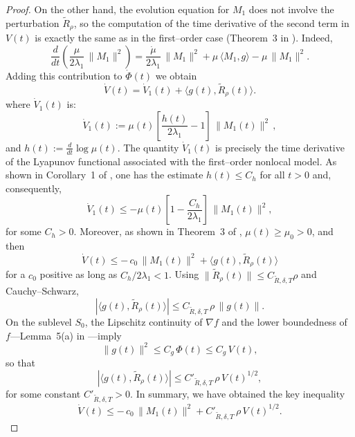 \documentclass{article} %
\begin{document}
\begin{proof}
On the other hand, the evolution equation for $M_1$ does not involve the perturbation $\widetilde R_\rho$, so the computation of the time derivative of the second term in $V(t)$ is exactly the same as in the first–order case (Theorem~3 in \cite{heredia2025modelingadagradrmspropadam}). Indeed,
\[
\frac{d}{dt}\!\left(\frac{\mu}{2\lambda_1}\,\|M_1\|^2\right)
=
\frac{\dot\mu}{2\lambda_1}\,\|M_1\|^2
+
\mu\,\langle M_1,g\rangle
-
\mu\,\|M_1\|^2.
\]
Adding this contribution to $\dot\Phi(t)$ we obtain
\[
\dot V(t)
= \dot V_1(t) +\langle g(t),\widetilde R_\rho(t)\rangle.
\]
where $\dot V_1(t)$ is:
\[
\dot V_1(t):=\mu(t) \left[\frac{h(t)}{2\lambda_1}-1 \right]\,\|M_1(t)\|^2\,,
\]
and $h(t):=\frac{d}{dt} \log \mu(t)$. The quantity $\dot V_1(t)$ is precisely the time derivative of the Lyapunov functional associated with the first–order nonlocal model. As shown in Corollary~1 of \cite{heredia2025modelingadagradrmspropadam}, one has the estimate $h(t) \leq C_h$ for all $t>0$ and, consequently,
\[
\dot V_1(t)
\le - \mu(t)\left[ 1- \frac{C_h}{2\lambda_1}\right]\,\|M_1(t)\|^2,
\]
for some $C_h>0$. Moreover, as shown in Theorem~3 of \cite{heredia2025modelingadagradrmspropadam},  $\mu(t)\geq \mu_0 >0$, and then
\[
\dot V(t)
\le
-\,c_0\,\|M_1(t)\|^2
+
\langle g(t),\widetilde R_\rho(t)\rangle
\]
for a $c_0$ positive as long as $C_h/2\lambda_1 <1$.
Using $\|\widetilde R_\rho(t)\|\le C_{\widetilde R, \delta,T} \rho$ and Cauchy–Schwarz,
\[
|\langle g(t),\widetilde R_\rho(t)\rangle|
\le C_{\widetilde R,\delta,T}\,\rho\,\|g(t)\|.
\]
On the sublevel $S_0$, the Lipschitz continuity of $\nabla f$ and the lower boundedness of $f$---Lemma~5(a) in \cite{heredia2025modelingadagradrmspropadam}---imply
\[
\|g(t)\|^2
\le C_g\,\Phi(t) \le C_g\,V(t),
\]
so that
\[
|\langle g(t),\widetilde R_\rho(t)\rangle|
\le C'_{\widetilde R,\delta,T}\,\rho\,V(t)^{1/2},
\]
for some constant $C'_{\widetilde R,\delta,T}>0$. In summary, we have obtained the key inequality
\begin{equation}\label{eq:key-V-ineq}
\dot V(t)
\le
-\,c_0\,\|M_1(t)\|^2
+
C'_{\widetilde R,\delta,T}\,\rho\,V(t)^{1/2}.
\end{equation}


\end{proof}
\end{document}
